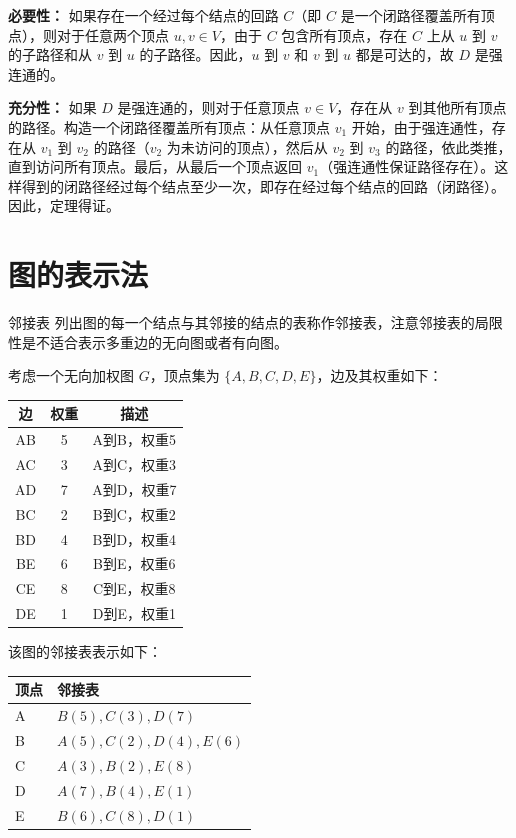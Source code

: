 \textbf{必要性：} 如果存在一个经过每个结点的回路 $C$（即 $C$ 是一个闭路径覆盖所有顶点），则对于任意两个顶点 $u, v \in V$，由于 $C$ 包含所有顶点，存在 $C$ 上从 $u$ 到 $v$ 的子路径和从 $v$ 到 $u$ 的子路径。因此，$u$ 到 $v$ 和 $v$ 到 $u$ 都是可达的，故 $D$ 是强连通的。

\textbf{充分性：} 如果 $D$ 是强连通的，则对于任意顶点 $v \in V$，存在从 $v$ 到其他所有顶点的路径。构造一个闭路径覆盖所有顶点：从任意顶点 $v_1$ 开始，由于强连通性，存在从 $v_1$ 到 $v_2$ 的路径（$v_2$ 为未访问的顶点），然后从 $v_2$ 到 $v_3$ 的路径，依此类推，直到访问所有顶点。最后，从最后一个顶点返回 $v_1$（强连通性保证路径存在）。这样得到的闭路径经过每个结点至少一次，即存在经过每个结点的回路（闭路径）。因此，定理得证。

\section{图的表示法}
\begin{definition}{邻接表}{}
    列出图的每一个结点与其邻接的结点的表称作邻接表，注意邻接表的局限性是不适合表示多重边的无向图或者有向图。
\end{definition}
考虑一个无向加权图 $G$，顶点集为 $\{A, B, C, D, E\}$，边及其权重如下：
\begin{center}
\begin{tabular}{c|c|c}
边 & 权重 & 描述 \\
\hline
AB & 5 & A到B，权重5 \\
AC & 3 & A到C，权重3 \\
AD & 7 & A到D，权重7 \\
BC & 2 & B到C，权重2 \\
BD & 4 & B到D，权重4 \\
BE & 6 & B到E，权重6 \\
CE & 8 & C到E，权重8 \\
DE & 1 & D到E，权重1 \\
\end{tabular}
\end{center}
该图的邻接表表示如下：
\begin{center}
\begin{tabular}{l|l}
顶点 & 邻接表 \\
\hline
A & $B(5) , C(3) , D(7)$ \\
B & $A(5) , C(2) , D(4) , E(6)$ \\
C & $A(3) , B(2) , E(8)$ \\
D & $A(7) , B(4) , E(1)$ \\
E & $B(6) , C(8) , D(1)$ \\
\end{tabular}
\end{center}
